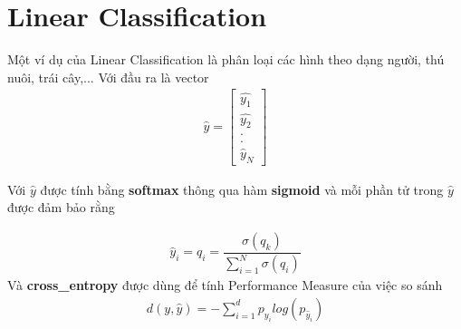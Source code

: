 \documentclass[12pt]{article}
\newcommand{\<}{\langle}
\renewcommand{\>}{\rangle}
\theoremstyle{definition}
\begin{document}
\section{Linear Classification}
Một ví dụ của Linear Classification là phân loại các hình theo dạng người, thú nuôi, trái cây,... Với đầu ra là vector 
\begin{align*}
    \widehat{y}=
    \begin{bmatrix} 
    \widehat{y_1}\\
    \widehat{y_2}\\
    .\\
    .\\
    \widehat{y}_N
    \end{bmatrix}
\end{align*}

Với $\widehat{y}$ được tính bằng \textbf{softmax} thông qua hàm \textbf{sigmoid} 
và mỗi phần tử trong $\widehat{y}$ được đảm bảo rằng 

\begin{align*}
    \widehat{y}_i=q_i=\dfrac{\sigma(q_k)}{\sum_{i=1}^{N}\sigma(q_i) }
\end{align*}
Và \textbf{cross\_entropy} được dùng để tính Performance Measure của việc so sánh 
\begin{align*}
    d(y,\widehat{y})=-\sum_{i=1}^{d}p_{y_{i}}log(p_{\widehat{y}_{i}})
\end{align*}
\end{document}
